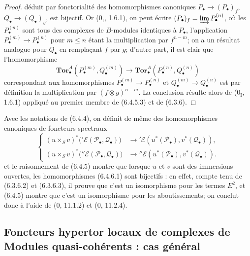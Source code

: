 \begin{proof}
déduit par fonctorialité des homomorphismes canoniques
$P_\bullet\to(P_\bullet)_f$, $Q_\bullet\to(Q_\bullet)_g$, est bijectif. Or
($0_{\mathrm I}$, 1.6.1), on peut écrire
$(P_\bullet)_f=\varinjlim P_\bullet^{(n)}$, où les $P_\bullet^{(n)}$ sont tous
des complexes de $B$-modules identiques à $P_\bullet$, l'application
$P_\bullet^{(m)}\to P_\bullet^{(n)}$ pour $m\leqslant n$ étant la
multiplication par $f^{n-m}$; on a un résultat analogue pour $Q_\bullet$ en
remplaçant $f$ par $g$; d'autre part, il est clair que l'homomorphisme
\[
  \mathbf{Tor}_\bullet^A(P_\bullet^{(m)},Q_\bullet^{(m)})
  \longrightarrow
  \mathbf{Tor}_\bullet^A(P_\bullet^{(n)},Q_\bullet^{(n)})
\]
correspondant aux homomorphismes
$P_\bullet^{(m)}\to P_\bullet^{(n)}$ et
$Q_\bullet^{(m)}\to Q_\bullet^{(n)}$ est par définition la multiplication
par $(f\otimes g)^{n-m}$. La conclusion résulte alors de ($0_{\mathrm I}$,
1.6.1) appliqué au premier membre de (6.4.5.3) et de (6.3.6).
\end{proof}

\begin{env}[6.4.6]
Avec les notations de (6.4.4), on définit de même des homomorphismes canoniques
de foncteurs spectraux
\[
  \left\{
  \begin{aligned}
  (u\times_S v)^*\bigl('\mathscr E(\mathscr P_\bullet,\mathscr Q_\bullet)\bigr)
    &\longrightarrow
      '\mathscr E(u^*(\mathscr P_\bullet),v^*(\mathscr Q_\bullet)),\\
  (u\times_S v)^*\bigl(''\mathscr E(\mathscr P_\bullet,\mathscr Q_\bullet)\bigr)
    &\longrightarrow
      ''\mathscr E(u^*(\mathscr P_\bullet),v^*(\mathscr Q_\bullet)).
  \end{aligned}
  \right.
  \tag{6.4.6.1}\label{III.6.4.6.1.fr}
\]
et le raisonnement de (6.4.5) montre que lorsque $u$ et $v$ sont des
immersions ouvertes, les homomorphismes (6.4.6.1) sont bijectifs : en effet,
compte tenu de (6.3.6.2) et (6.3.6.3), il prouve que c'est un isomorphisme pour
les termes $E^2$, et (6.4.5) montre que c'est un isomorphisme pour les
aboutissements; on conclut donc à l'aide de (0, 11.1.2) et (0, 11.2.4).
\end{env}

\subsection{Foncteurs hypertor locaux de complexes de Modules quasi-cohérents : cas général}

